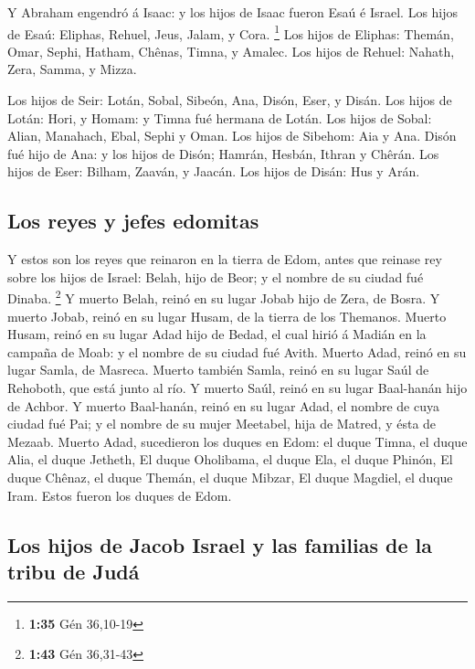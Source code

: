  Y Abraham engendró á Isaac: y los hijos de Isaac fueron
Esaú é Israel.  Los hijos de Esaú: Eliphas, Rehuel, Jeus,
Jalam, y Cora. \footnote{\textbf{1:35} Gén 36,10-19}  Los
hijos de Eliphas: Themán, Omar, Sephi, Hatham, Chênas, Timna, y Amalec.
 Los hijos de Rehuel: Nahath, Zera, Samma, y Mizza.

 Los hijos de Seir: Lotán, Sobal, Sibeón, Ana, Disón,
Eser, y Disán.  Los hijos de Lotán: Hori, y Homam: y
Timna fué hermana de Lotán.  Los hijos de Sobal: Alian,
Manahach, Ebal, Sephi y Oman. Los hijos de Sibehom: Aia y Ana.
 Disón fué hijo de Ana: y los hijos de Disón; Hamrán,
Hesbán, Ithran y Chêrán.  Los hijos de Eser: Bilham,
Zaaván, y Jaacán. Los hijos de Disán: Hus y Arán.

\hypertarget{los-reyes-y-jefes-edomitas}{%
\subsection{Los reyes y jefes
edomitas}\label{los-reyes-y-jefes-edomitas}}

 Y estos son los reyes que reinaron en la tierra de Edom,
antes que reinase rey sobre los hijos de Israel: Belah, hijo de Beor; y
el nombre de su ciudad fué Dinaba. \footnote{\textbf{1:43} Gén 36,31-43}
 Y muerto Belah, reinó en su lugar Jobab hijo de Zera, de
Bosra.  Y muerto Jobab, reinó en su lugar Husam, de la
tierra de los Themanos.  Muerto Husam, reinó en su lugar
Adad hijo de Bedad, el cual hirió á Madián en la campaña de Moab: y el
nombre de su ciudad fué Avith.  Muerto Adad, reinó en su
lugar Samla, de Masreca.  Muerto también Samla, reinó en
su lugar Saúl de Rehoboth, que está junto al río.  Y
muerto Saúl, reinó en su lugar Baal-hanán hijo de Achbor.
 Y muerto Baal-hanán, reinó en su lugar Adad, el nombre
de cuya ciudad fué Pai; y el nombre de su mujer Meetabel, hija de
Matred, y ésta de Mezaab.  Muerto Adad, sucedieron los
duques en Edom: el duque Timna, el duque Alia, el duque Jetheth,
 El duque Oholibama, el duque Ela, el duque Phinón,
 El duque Chênaz, el duque Themán, el duque Mibzar,
 El duque Magdiel, el duque Iram. Estos fueron los duques
de Edom.

\hypertarget{los-hijos-de-jacob-israel-y-las-familias-de-la-tribu-de-juduxe1}{%
\subsection{Los hijos de Jacob Israel y las familias de la tribu de
Judá}\label{los-hijos-de-jacob-israel-y-las-familias-de-la-tribu-de-juduxe1}}

